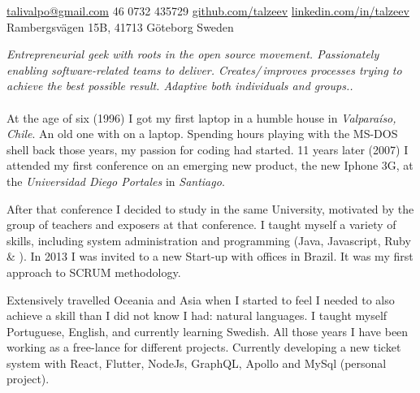 \documentclass[10pt,a4paper]{article}
\begin{document}
\sloppy  %



\nobreakvspace{0.3em}  %

\noindent\href{mailto:talivalpo.at.gmail.dot.com}{talivalpo\mbox{}@\mbox{}gmail.com}\sbull
\textsmaller{+}46 0732 435729\sbull
\href{https://github.com/talzeev}{github.com/talzeev}\sbull
\href{http://linkedin.com/in/talzeev}{linkedin.com/in/talzeev}
\\
Rambergsvägen 15B,
41713\thinspace {\large \sc }\sbull
Göteborg\sbull
Sweden

\spacedhrule{0.9em}{-0.4em}  %


\vspace{-1.3em}  %
\begin{multicols}{2}  %
\noindent \emph{Entrepreneurial geek with roots in the open source movement. Passionately enabling software-related teams to deliver. Creates/\,improves processes trying to achieve the best possible result. Adaptive both individuals and groups..}
\\
\\
At the age of six (1996) I got my first laptop in a humble house in \emph{Valparaíso, Chile}.  An old one with  on a  laptop. Spending hours playing with the MS-DOS shell back those years, my passion for coding had started. 11 years later (2007) I attended my first conference on an emerging new product, the new Iphone 3G, at the \emph{Universidad Diego Portales} in \emph{Santiago}.

After that conference I decided to study in the same University, motivated by the group of teachers and exposers at that conference. I taught myself a variety of skills, including system administration and programming (Java, Javascript, Ruby \& \CPP). In 2013 I was invited to a new Start-up with offices in Brazil. It was my first approach to SCRUM methodology.

Extensively travelled Oceania and Asia when I started to feel I needed to also achieve a skill than I did not know I had: natural languages. I taught myself Portuguese, English, and currently learning Swedish. All those years I have been working as a free-lance for different projects. Currently developing a new ticket system with React, Flutter, NodeJs, GraphQL, Apollo and MySql (personal project).



\end{multicols}
\end{document}
